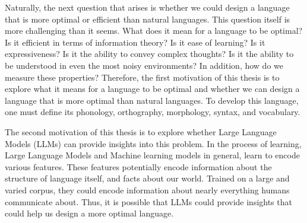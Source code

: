 Naturally, the next question that arises is whether we could design a language that is more optimal or efficient than natural languages.
This question itself is more challenging than it seems. What does it mean for a language to be optimal? Is it efficient in terms of information theory?
Is it ease of learning? Is it expressiveness? Is it the ability to convey complex thoughts? Is it the ability to be understood in even the most 
noisy environments? In addition, how do we measure these properties? Therefore, the first motivation of this thesis is to explore what it means 
for a language to be optimal and whether we can design a language that is more optimal than natural languages. To develop this language, one 
must define its phonology, orthography, morphology, syntax, and vocabulary.

The second motivation of this thesis is to explore whether Large Language Models (LLMs) can provide insights into this problem. In the process 
of learning, Large Language Models and Machine learning models in general, learn to encode various features. These features potentially encode
information about the structure of language itself, and facts about our world. Trained on a large and varied corpus, they could encode information
about nearly everything humans communicate about. Thus, it is possible that LLMs could provide insights that could help us design a more optimal language.


